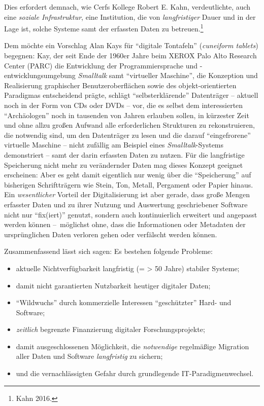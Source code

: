 \documentclass[a4paper,
fontsize=11pt,
oneside,
numbers=noperiodatend,
parskip=half-,
bibliography=totoc,
final
]{scrartcl}
\begin{document}
Dies erfordert demnach, wie Cerfs Kollege Robert E. Kahn, verdeutlichte,
auch eine \emph{soziale Infrastruktur}, eine Institution, die von
\emph{langfristiger} Dauer und in der Lage ist, solche Systeme samt der
erfassten Daten zu betreuen.\footnote{Kahn 2016.}

Dem möchte ein Vorschlag Alan Kays für \enquote{digitale Tontafeln}
(\emph{cuneiform tablets}) begegnen: Kay, der seit Ende der 1960er Jahre
beim XEROX Palo Alto Research Center (PARC) die Entwicklung der
Programmiersprache und -entwicklungsumgebung \emph{Smalltalk} samt
\enquote{virtueller Maschine}, die Konzeption und Realisierung
graphischer Benutzeroberflächen sowie des objekt-orientierten Paradigmas
entscheidend prägte, schlägt \enquote{selbsterklärende} Datenträger --
aktuell noch in der Form von CDs oder DVDs -- vor, die es selbst dem
interessierten \enquote{Archäologen} noch in tausenden von Jahren
erlauben sollen, in kürzester Zeit und ohne allzu großen Aufwand alle
erforderlichen Strukturen zu rekonstruieren, die notwendig sind, um den
Datenträger zu lesen und die darauf \enquote{eingefrorene} virtuelle
Maschine -- nicht zufällig am Beispiel eines \emph{Smalltalk}-Systems
demonstriert -- samt der darin erfassten Daten zu nutzen. Für die
langfristige Speicherung nicht mehr zu verändernder Daten mag dieses
Konzept geeignet erscheinen: Aber es geht damit eigentlich nur wenig
über die \enquote{Speicherung} auf bisherigen Schriftträgern wie Stein,
Ton, Metall, Pergament oder Papier hinaus. Ein \emph{wesentlicher}
Vorteil der Digitalisierung ist aber gerade, dass große Mengen erfasster
Daten und zu ihrer Nutzung und Auswertung geschriebener Software nicht
nur \enquote{fix(iert)} genutzt, sondern auch kontinuierlich erweitert
und angepasst werden können --~möglichst ohne, dass die Informationen
oder Metadaten der ursprünglichen Daten verloren gehen oder verfälscht
werden können.

Zusammenfassend lässt sich sagen: Es bestehen folgende Probleme:

\begin{itemize}
\item
  aktuelle Nichtverfügbarkeit langfristig (= \textgreater{} 50 Jahre)
  stabiler Systeme;
\item
  damit nicht garantierten Nutzbarkeit heutiger digitaler Daten;
\item
  \enquote{Wildwuchs} durch kommerzielle Interessen
  \enquote{geschützter} Hard- und Software;
\item
  \emph{zeitlich} begrenzte Finanzierung digitaler Forschungsprojekte;
\item
  damit ausgeschlossenen Möglichkeit, die \emph{notwendige} regelmäßige
  Migration aller Daten und Software \emph{langfristig} zu sichern;
\item
  und die vernachlässigten Gefahr durch grundlegende
  IT-Paradigmenwechsel.
\end{itemize}
\end{document}
